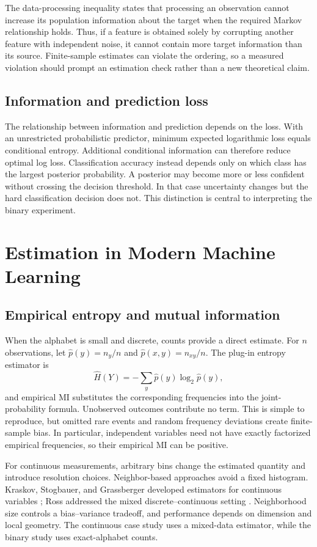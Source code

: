 \documentclass[journal,11pt]{IEEEtran}
\begin{document}
The data-processing inequality states that processing an observation cannot increase its population information about the target when the required Markov relationship holds. Thus, if a feature is obtained solely by corrupting another feature with independent noise, it cannot contain more target information than its source. Finite-sample estimates can violate the ordering, so a measured violation should prompt an estimation check rather than a new theoretical claim.

\subsection{Information and prediction loss}
The relationship between information and prediction depends on the loss. With an unrestricted probabilistic predictor, minimum expected logarithmic loss equals conditional entropy. Additional conditional information can therefore reduce optimal log loss. Classification accuracy instead depends only on which class has the largest posterior probability. A posterior may become more or less confident without crossing the decision threshold. In that case uncertainty changes but the hard classification decision does not. This distinction is central to interpreting the binary experiment.

\section{Estimation in Modern Machine Learning}
\subsection{Empirical entropy and mutual information}
When the alphabet is small and discrete, counts provide a direct estimate. For $n$ observations, let $\hat p(y)=n_y/n$ and $\hat p(x,y)=n_{xy}/n$. The plug-in entropy estimator is
\begin{equation}
\widehat H(Y)=-\sum_y\hat p(y)\log_2\hat p(y),
\end{equation}
and empirical MI substitutes the corresponding frequencies into the joint-probability formula. Unobserved outcomes contribute no term. This is simple to reproduce, but omitted rare events and random frequency deviations create finite-sample bias. In particular, independent variables need not have exactly factorized empirical frequencies, so their empirical MI can be positive.

For continuous measurements, arbitrary bins change the estimated quantity and introduce resolution choices. Neighbor-based approaches avoid a fixed histogram. Kraskov, Stogbauer, and Grassberger developed estimators for continuous variables \cite{kraskov}; Ross addressed the mixed discrete--continuous setting \cite{ross}. Neighborhood size controls a bias--variance tradeoff, and performance depends on dimension and local geometry. The continuous case study uses a mixed-data estimator, while the binary study uses exact-alphabet counts.
\end{document}
